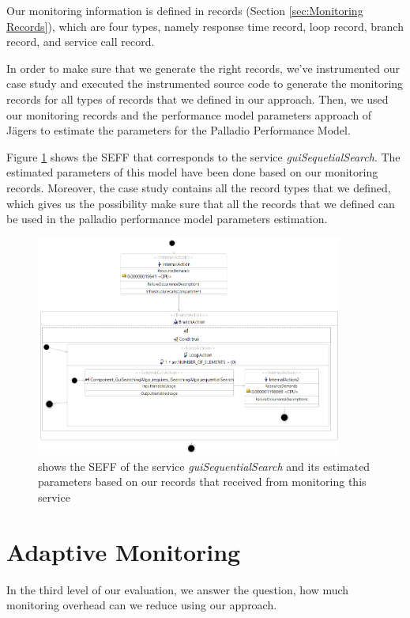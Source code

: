 Our monitoring information is defined in records (Section \ref{sec:Monitoring Records}), which are four types, namely response time record, loop record, branch record, and service call record. 

In order to make sure that we generate the right records, we've instrumented our case study and executed the instrumented source code to generate the monitoring records for all types of records that we defined in our approach. Then, we used our monitoring records and the performance model parameters approach of Jägers \cite{jagers2018Iterative} to estimate the parameters for the Palladio Performance Model.

Figure \ref{fig:guiSequentialSearch_seff} shows the SEFF that corresponds to the service \textit{guiSequetialSearch}. The estimated parameters of this model have been done based on our monitoring records. Moreover, the case study contains all the record types that we defined, which gives us the possibility make sure that all the records that we defined can be used in the palladio performance model parameters estimation.


\begin{figure}[h]
\centering
\includegraphics[width=0.9\textwidth]{figures/records_evaluation}
\caption{shows the SEFF of the service \textit{guiSequentialSearch} and its estimated parameters based on our records that received from monitoring this service}
\label{fig:guiSequentialSearch_seff}
\end{figure}


\section{Adaptive Monitoring}
\label{sec:Adaptive Monitoring}
In the third level of our evaluation, we answer the question, how much monitoring overhead can we reduce using our approach. 

